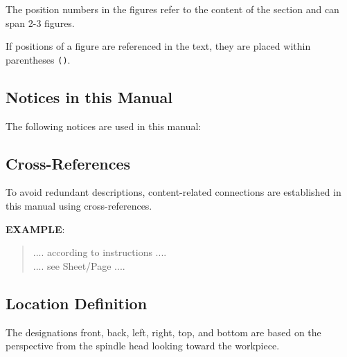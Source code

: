The position numbers in the figures refer to the content of the section and can span 2-3 figures.

If positions of a figure are referenced in the text, they are placed within parentheses \texttt{()}.

\subsection{Notices in this Manual}

The following notices are used in this manual:




\subsection{Cross-References}

To avoid redundant descriptions, content-related connections are established in this manual using cross-references.

\textbf{EXAMPLE}:
\begin{quote}
\noindent \hspace{-0.25cm} .... according to instructions .... \\
\hspace{1.3cm} .... see Sheet/Page ....
\end{quote}

\subsection{Location Definition}

The designations front, back, left, right, top, and bottom are based on the perspective from the spindle head looking toward the workpiece.

\renewcommand{\arraystretch}{1.3} %


